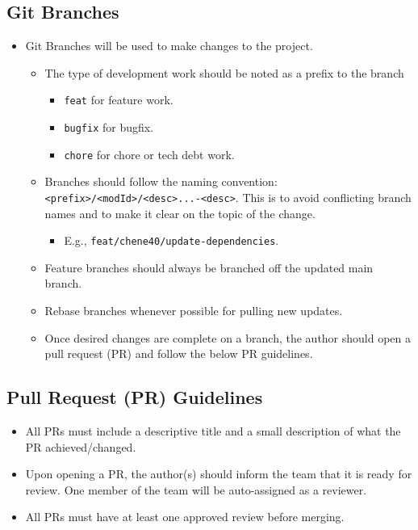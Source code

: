 \documentclass{article}
\begin{document}
\subsection{Git Branches}
\begin{itemize}
    \item Git Branches will be used to make changes to the project.
    \begin{itemize}
        \item The type of development work should be noted as a prefix to the
        branch
        \begin{itemize}
            \item \texttt{feat} for feature work.
            \item \texttt{bugfix} for bugfix.
            \item \texttt{chore} for chore or tech debt work.
        \end{itemize}
        \item Branches should follow the naming convention:
        \texttt{<prefix>/<modId>/<desc>...-<desc>}. This is to avoid conflicting
        branch names and to make it clear on the topic of the change.
        \begin{itemize}
            \item E.g., \texttt{feat/chene40/update-dependencies}.
        \end{itemize}
        \item Feature branches should always be branched off the updated main
        branch.
        \item Rebase branches whenever possible for pulling new updates.
        \item Once desired changes are complete on a branch, the author should
        open a pull request (PR) and follow the below PR guidelines.
    \end{itemize}
\end{itemize}

\newpage

\subsection{Pull Request (PR) Guidelines}
\begin{itemize}
    \item All PRs must include a descriptive title and a small description of
    what the PR achieved/changed.
    \item Upon opening a PR, the author(s) should inform the team that it is
    ready for review. One member of the team will be auto-assigned as a
    reviewer.
    \item All PRs must have at least one approved review before merging.
\end{itemize}
\end{document}
